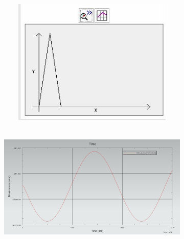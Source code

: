 \documentclass[12pt]{article}
\begin{document}
{\begin{figure}[H]
		\begin{subfigure}{0.49\textwidth}
			\centering\includegraphics[height=6cm,width=1\textwidth,keepaspectratio]{var2_2.jpeg}
			\caption{}
			\label{fig:var2_2.jpeg}
		\end{subfigure}
		\begin{subfigure}{0.49\textwidth}
			\centering\includegraphics[height=6cm,width=1\textwidth,keepaspectratio]{var2_3.jpeg}
			\caption{}
			\label{fig:var2_3.jpeg}
		\end{subfigure}
	\end{figure}
}
\end{document}
